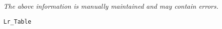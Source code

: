 \label{pkg:lr\_table}

{\tiny \it The above information is manually maintained and may contain errors.}
\begin{verbatim}
Lr_Table
\end{verbatim}
